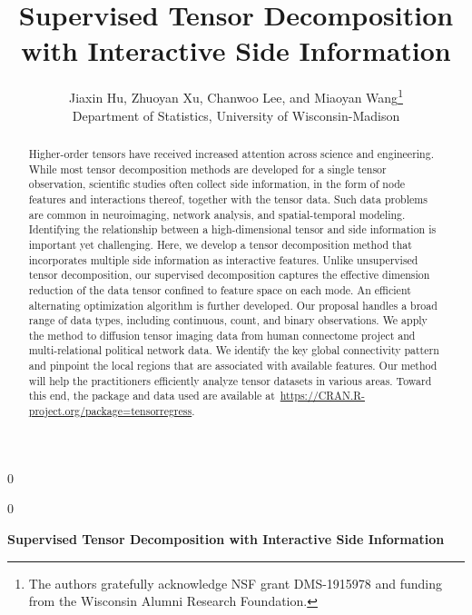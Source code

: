 \documentclass[12pt]{article}
\newcommand{\blind}{0}
\theoremstyle{definition}
\theoremstyle{definition}
\begin{document}
%

\def\spacingset#1{\renewcommand{\baselinestretch}%
{#1}\small\normalsize} \spacingset{1}




\blind
{
  \title{\bf Supervised Tensor Decomposition with Interactive Side Information}
  \author{Jiaxin Hu, Zhuoyan Xu, Chanwoo Lee, and Miaoyan Wang\thanks{The authors gratefully acknowledge NSF grant DMS-1915978 and funding from the Wisconsin Alumni Research Foundation. }\hspace{.2cm}\\
    Department of Statistics, University of Wisconsin-Madison}
  \maketitle
  
  
  
} \fi

\blind
{
  \bigskip
  \bigskip
  \bigskip
  \begin{center}
    {\LARGE\bf Supervised Tensor Decomposition with Interactive Side Information}
\end{center}
  \medskip
} \fi



\bigskip
\begin{abstract}
Higher-order tensors have received increased attention across science and engineering. While most tensor decomposition methods are developed for a single tensor observation, scientific studies often collect side information, in the form of node features and interactions thereof, together with the tensor data. Such data problems are common in neuroimaging, network analysis, and spatial-temporal modeling. Identifying the relationship between a high-dimensional tensor and side information is important yet challenging. Here, we develop a tensor decomposition method that incorporates multiple side information as interactive features. Unlike unsupervised tensor decomposition, our supervised decomposition captures the effective dimension reduction of the data tensor confined to feature space on each mode. An efficient alternating optimization algorithm is further developed. Our proposal handles a broad range of data types, including continuous, count, and binary observations. We apply the method to diffusion tensor imaging data from human connectome project and multi-relational political network data. We identify the key global connectivity pattern and pinpoint the local regions that are associated with available features. Our method will help the practitioners efficiently analyze tensor datasets in various areas. Toward this end, the package and data used are available at~\url{https://CRAN.R-project.org/package=tensorregress}.

\end{abstract}
\end{document}
